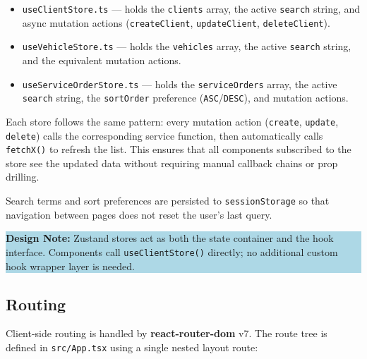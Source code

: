 \documentclass[12pt, a4paper]{report}
\newcommand{\infobox}[1]{%
	\vspace{6pt}
	\noindent
	\colorbox{LightBlue}{%
		\begin{minipage}{\dimexpr\linewidth-2\fboxsep}%
			\vspace{4pt}
			\small #1
			\vspace{4pt}
		\end{minipage}%
	}
	\vspace{6pt}
}
\newcommand{\term}[1]{\textbf{\color{Blue}#1}}
\begin{document}
	\begin{itemize}
		\item \texttt{useClientStore.ts} --- holds the \texttt{clients} array,
		      the active \texttt{search} string, and async mutation actions
		      (\texttt{createClient}, \texttt{updateClient}, \texttt{deleteClient}).
		\item \texttt{useVehicleStore.ts} --- holds the \texttt{vehicles} array,
		      the active \texttt{search} string, and the equivalent mutation actions.
		\item \texttt{useServiceOrderStore.ts} --- holds the \texttt{serviceOrders}
		      array, the active \texttt{search} string, the \texttt{sortOrder}
		      preference (\texttt{ASC}/\texttt{DESC}), and mutation actions.
	\end{itemize}

	Each store follows the same pattern: every mutation action (\texttt{create},
	\texttt{update}, \texttt{delete}) calls the corresponding service function,
	then automatically calls \texttt{fetchX()} to refresh the list. This ensures
	that all components subscribed to the store see the updated data without
	requiring manual callback chains or prop drilling.

	Search terms and sort preferences are persisted to \texttt{sessionStorage} so
	that navigation between pages does not reset the user's last query.

	\infobox{\textbf{Design Note:} Zustand stores act as both the state container
		and the hook interface. Components call \texttt{useClientStore()} directly;
		no additional custom hook wrapper layer is needed.}

	\subsection{Routing}
	\label{sec:routing}
	Client-side routing is handled by \term{react-router-dom} v7. The route
	tree is defined in \texttt{src/App.tsx} using a single nested layout route:
\end{document}
